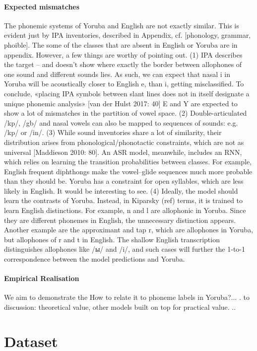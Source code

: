 \documentclass[11pt]{article}
\begin{document}
\paragraph{Expected mismatches} The phonemic systems of Yoruba and English are not exactly similar. This is evident just by IPA inventories, described in Appendix, cf. [phonology, grammar, phoible]. The some of the classes that are absent in English or Yoruba are in appendix. However, a few things are worthy of pointing out. (1) IPA describes the target -- and doesn't show where exactly the border between allophones of one sound and different sounds lies. As such, we can expect that nasal i in Yoruba will be acoustically closer to English e, than i, getting misclassified. To conclude, «placing IPA symbols between slant lines does not in itself designate a unique phonemic analysis» [van der Hulst 2017: 40] E and Y are expected to show a lot of mismatches in the partition of vowel space. (2) Double-articulated /kp/, /gb/ and nasal vowels can also be mapped to sequences of sounds: e.g. /kp/ or /in/. (3) While sound inventories share a lot of similarity, their distribution arises from phonological/phonotactic constraints, which are not as universal [Maddieson 2010: 80]. An ASR model, meanwhile, includes an RNN, which relies on learning the transition probabilities between classes. For example, English frequent diphthongs make the vowel--glide sequences much more probable than they should be. Yoruba has a constraint for open syllables, which are less likely in English. It would be interesting to see. (4) Ideally, the model should learn the contrasts of Yoruba. Instead, in Kiparsky (ref) terms, it is trained to learn English distinctions. For example, n and l are allophonic in Yoruba. Since they are different phonemes in English, the unnecessary distinction appears. Another example are the approximant and tap r, which are allophones in Yoruba, but allophones of r and t in English. The shallow English transcription distinguishes allophones like /ы/ and /i/, and such cases will further the 1-to-1 correspondence between the model predictions and Yoruba.

\paragraph{Empirical Realisation} We aim to demonstrate the How to relate it to phoneme labels in Yoruba?... . to discussion: theoretical value, other models built on top for practical value.   ..

\section{Dataset}
\end{document}
